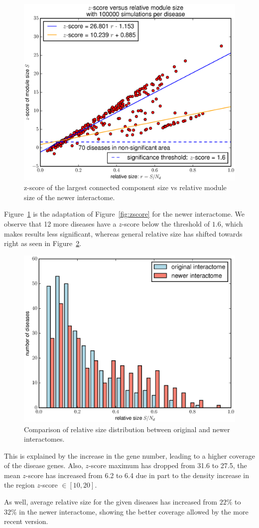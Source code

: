 \documentclass[letterpaper]{article}
\begin{document}
	\begin{figure}[!h]
		\includegraphics[width=.5\textwidth]{images/new_interactome_S4.b100000.eps}
		\caption{z-score of the largest connected component size vs relative module size of the newer interactome.
		\label{fig:new interactome zscore}}
	\end{figure}

	Figure~\ref{fig:new interactome zscore} is the adaptation of Figure~\ref{fig:zscore} for the newer interactome.
	We observe that 12 more diseases have a $z$-score below the threshold of $1.6$, which makes results less significant,
	whereas general relative size has shifted towards right as seen in Figure~\ref{fig:rel sizes comparison}.

	\begin{figure}[!h]
		\includegraphics[width=.5\textwidth]{images/rel_sizes_comparison.eps}
		\caption{Comparison of relative size distribution between original and newer interactomes.\label{fig:rel sizes comparison}}
	\end{figure}

	This is explained by the increase in the gene number, leading to a higher coverage of the disease genes. Also, $z$-score
	maximum has dropped from 31.6 to 27.5, the mean $z$-score has increased from 6.2 to 6.4 due in part to the density
	increase in the region $z$-score $\in [10, 20]$.

	As well, average relative size for the given diseases has increased from $22\%$ to $32\%$ in the newer interactome,
	showing the better coverage allowed by the more recent version.
\end{document}
